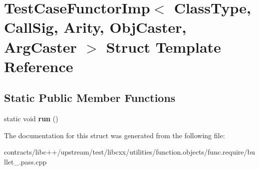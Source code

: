\hypertarget{struct_test_case_functor_imp}{}\section{Test\+Case\+Functor\+Imp$<$ Class\+Type, Call\+Sig, Arity, Obj\+Caster, Arg\+Caster $>$ Struct Template Reference}
\label{struct_test_case_functor_imp}
\subsection*{Static Public Member Functions}
\begin{DoxyCompactItemize}
\item 
\mbox{\label{struct_test_case_functor_imp_a68c75e049d7d9b6252907fa9368f874e}} 
static void {\bfseries run} ()
\end{DoxyCompactItemize}


The documentation for this struct was generated from the following file\+:\begin{DoxyCompactItemize}
\item 
contracts/libc++/upstream/test/libcxx/utilities/function.\+objects/func.\+require/bullet\+\_.\+pass.\+cpp\end{DoxyCompactItemize}
